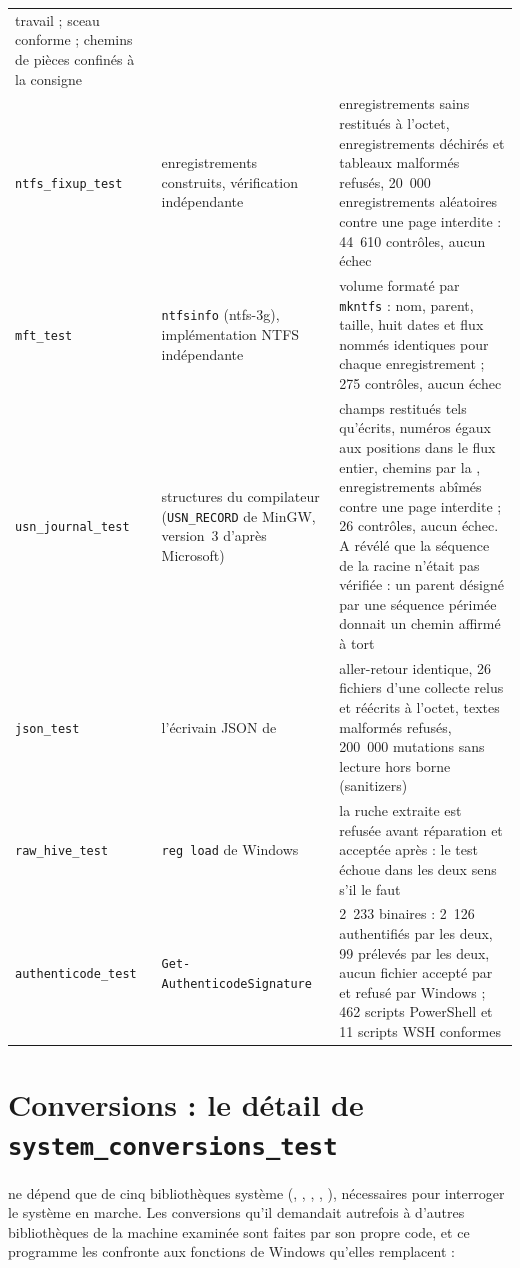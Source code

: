 \documentclass[11pt,a4paper,oneside]{report}
\begin{document}
\begin{longtable}{@{}L{4.6cm}L{3.8cm}L{6.6cm}@{}}
  travail ; sceau conforme ; chemins de pièces confinés à la consigne \\
\texttt{ntfs\_fixup\_test} & enregistrements construits, vérification indépendante &
  enregistrements sains restitués à l'octet, enregistrements déchirés et
  tableaux malformés refusés, 20~000 enregistrements aléatoires contre une page
  interdite : 44~610 contrôles, aucun échec \\
\texttt{mft\_test} & \texttt{ntfsinfo} (ntfs-3g), implémentation NTFS indépendante &
  volume formaté par \texttt{mkntfs} : nom, parent, taille, huit dates et flux
  nommés identiques pour chaque enregistrement ; 275 contrôles, aucun échec \\
\texttt{usn\_journal\_test} & structures du compilateur (\texttt{USN\_RECORD}
  de MinGW, version~3 d'après Microsoft) &
  champs restitués tels qu'écrits, numéros égaux aux positions dans le flux
  entier, chemins par la , enregistrements abîmés contre une
  page interdite ; 26 contrôles, aucun échec. A révélé que la séquence de la
  racine n'était pas vérifiée : un parent désigné par une séquence périmée
  donnait un chemin affirmé à tort \\
\texttt{json\_test} & l'écrivain JSON de \wac{} & aller-retour identique,
  26 fichiers d'une collecte relus et réécrits à l'octet, textes malformés
  refusés, 200~000 mutations sans lecture hors borne (sanitizers) \\
\texttt{raw\_hive\_test} & \texttt{reg load} de Windows &
  la ruche extraite est refusée avant réparation et acceptée après : le test
  échoue dans les deux sens s'il le faut \\
\texttt{authenticode\_test} & \texttt{Get-Authenticode}\allowbreak\texttt{Signature} &
  2~233 binaires : 2~126 authentifiés par les deux, 99 prélevés par les deux,
  aucun fichier accepté par \wac{} et refusé par Windows ; 462 scripts
  PowerShell et 11 scripts WSH conformes \\
\bottomrule
\end{longtable}

\section{Conversions : le détail de \texttt{system\_conversions\_test}}

\wac{} ne dépend que de cinq bibliothèques système (,
, , , ),
nécessaires pour interroger le système en marche. Les conversions qu'il
demandait autrefois à d'autres bibliothèques de la machine examinée sont faites
par son propre code, et ce programme les confronte aux fonctions de Windows
qu'elles remplacent :
\end{document}
